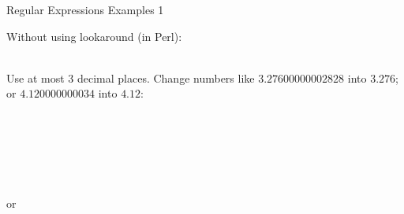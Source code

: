\documentclass[11pt, a4paper, landscape]{scrartcl}
\newcommand{\regex}[1]{\texttt{#1}}
\begin{document}
\begin{cheatsheet}{Regular Expressions Examples 1}
\begin{col2}
Without using lookaround (in Perl):\\
\regex{}\\


Use at most $3$ decimal places. Change numbers like $3.27600000002828$ into
$3.276$; or $4.120000000034$ into $4.12$:\\
\regex{}\\

\end{col2}

\begin{col3}


\regex{}\\


\regex{}\\


\regex{}\\
or\\
\regex{}\\

\end{col3}

\end{cheatsheet}

\newpage
\end{document}

